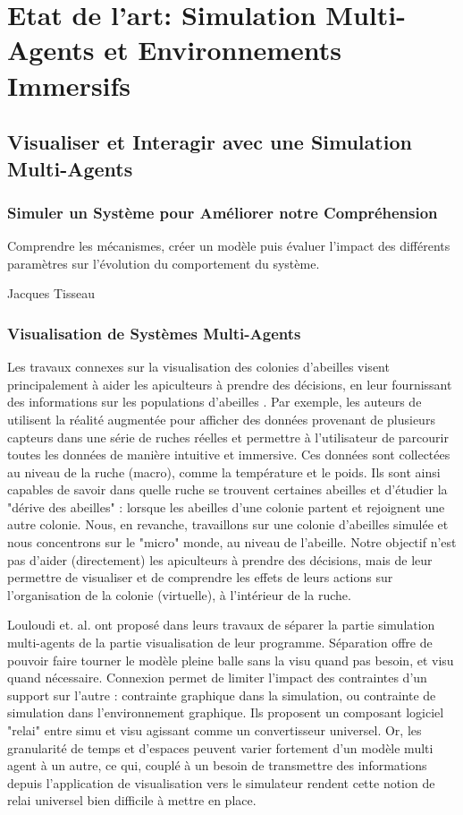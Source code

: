 \chapter{Etat de l'art: Simulation Multi-Agents et Environnements Immersifs}
	\section{Visualiser et Interagir avec une Simulation Multi-Agents}
		\subsection{Simuler un Système pour Améliorer notre Compréhension}
		Comprendre les mécanismes, créer un modèle puis évaluer l'impact des différents paramètres sur l'évolution du comportement du système.
		
		Jacques Tisseau
		\subsection{Visualisation de Systèmes Multi-Agents}
		
		Les travaux connexes sur la visualisation des colonies d'abeilles visent principalement à aider les apiculteurs à prendre des décisions, en leur fournissant des informations sur les populations d'abeilles \cite{engelke_visual_2016, engelke_melissar_2016, nguyen_augmented_2017}. Par exemple, les auteurs de \cite{engelke_visual_2016} utilisent la réalité augmentée pour afficher des données provenant de plusieurs capteurs dans une série de ruches réelles et permettre à l'utilisateur de parcourir toutes les données de manière intuitive et immersive. Ces données sont collectées au niveau de la ruche (macro), comme la température et le poids. Ils sont ainsi capables de savoir dans quelle ruche se trouvent certaines abeilles et d'étudier la "dérive des abeilles" : lorsque les abeilles d'une colonie partent et rejoignent une autre colonie. Nous, en revanche, travaillons sur une colonie d'abeilles simulée et nous concentrons sur le "micro" monde, au niveau de l'abeille. Notre objectif n'est pas d'aider (directement) les apiculteurs à prendre des décisions, mais de leur permettre de visualiser et de comprendre les effets de leurs actions sur l'organisation de la colonie (virtuelle), à l'intérieur de la ruche.
		
		Louloudi et. al. \cite{louloudi_new_2012} ont proposé dans leurs travaux de séparer la partie simulation multi-agents de la partie visualisation de leur programme. Séparation offre de pouvoir faire tourner le modèle pleine balle sans la visu quand pas besoin, et visu quand nécessaire. Connexion permet de limiter l'impact des contraintes d'un support sur l'autre : contrainte graphique dans la simulation, ou contrainte de simulation dans l'environnement graphique. Ils proposent un composant logiciel "relai" entre simu et visu agissant comme un convertisseur universel. Or, les granularité de temps et d'espaces peuvent varier fortement d'un modèle multi agent à un autre, ce qui, couplé à un besoin de transmettre des informations depuis l'application de visualisation vers le simulateur rendent cette notion de relai universel bien difficile à mettre en place.
		
